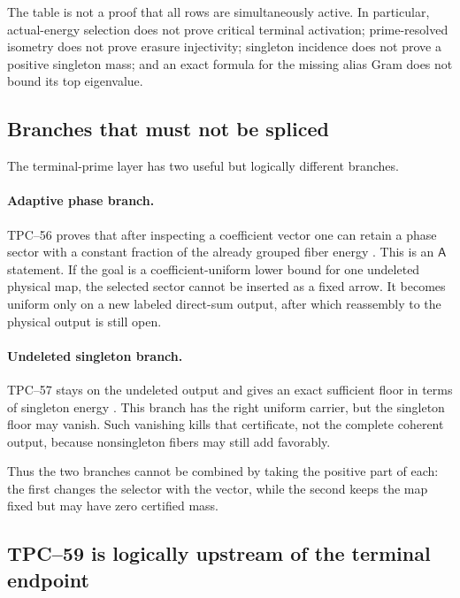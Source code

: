 The table is not a proof that all rows are simultaneously active.  In
particular, actual-energy selection does not prove critical terminal
activation; prime-resolved isometry does not prove erasure injectivity;
singleton incidence does not prove a positive singleton mass; and an exact
formula for the missing alias Gram does not bound its top eigenvalue.

\subsection{Branches that must not be spliced}

The terminal-prime layer has two useful but logically different branches.

\paragraph{Adaptive phase branch.}
TPC--56 proves that after inspecting a coefficient vector one can retain a
phase sector with a constant fraction of the already grouped fiber energy
\citep{WangTPC56}.  This is an \(\mathsf A\) statement.  If the goal is a
coefficient-uniform lower bound for one undeleted physical map, the selected
sector cannot be inserted as a fixed arrow.  It becomes uniform only on a
new labeled direct-sum output, after which reassembly to the physical output
is still open.

\paragraph{Undeleted singleton branch.}
TPC--57 stays on the undeleted output and gives an exact sufficient floor in
terms of singleton energy \citep{WangTPC57}.  This branch has the right
uniform carrier, but the singleton floor may vanish.  Such vanishing kills
that certificate, not the complete coherent output, because nonsingleton
fibers may still add favorably.

Thus the two branches cannot be combined by taking the positive part of
each: the first changes the selector with the vector, while the second keeps
the map fixed but may have zero certified mass.

\subsection{TPC--59 is logically upstream of the terminal endpoint}

